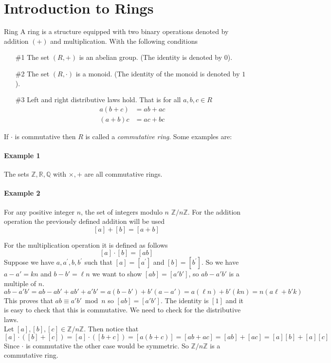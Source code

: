 \documentclass[16pt,a4paper]{article}
\theoremstyle{definition}
\begin{document}
\newpage

\section{Introduction to Rings}

\begin{defn}{Ring}{}
A ring is a structure equipped with two binary operations denoted by addition $(+)$ and multiplication. With the following conditions 
\begin{itemize}
\item[\#1] The set $(R,+)$ is an abelian group. (The identity is denoted by $0$). 


\item[\#2] The set $(R,\cdot)$ is a monoid. (The identity of the monoid is denoted by $1$). 

\item[\#3] Left and right distributive laws hold. That is for all $a,b,c\in R$
\begin{align*}
a(b+c) &= ab+ac\\
(a+b)c &= ac+bc
\end{align*}
\end{itemize}
\end{defn}

If $\cdot$ is commutative then $R$ is called a \emph{commutative ring}. Some examples are:
\paragraph*{Example 1} The sets $\mathbb{Z,R,Q}$ with $\times, +$ are all commutative rings.  

\paragraph*{Example 2} For any positive integer $n$, the set of integers modulo $n$ $\mathbb{Z}/n\mathbb{Z}$. For the addition operation the previously defined addition will be used 
\[[a]+[b]=[a+b]\]
 
For the multiplication operation it is defined as follows 
\[[a]\cdot[b] = [ab]\]
Suppose we have $a,a^\prime, b,b^\prime$ such that $[a]=[a^\prime]$ and $[b]=[b^\prime]$. So we have $a-a' = kn$ and $b-b'=\ell n$ we want to show $[ab]=[a'b']$, so $ab-a'b'$ is a multiple of $n$. 
\[ab-a'b' = ab-ab'+ab'+a'b' = a(b-b')+b'(a-a')=a(\ell n) + b'(kn) = n(a\ell + b'k)\]
This proves that $ab\equiv a'b'\bmod n$ so $[ab]=[a'b']$. The identity is $[1]$ and  it is easy to check that this is commutative. We need to check for the distributive laws. 
\\
Let $[a],[b],[c] \in \mathbb{Z}/n\mathbb{Z}$. Then notice that 
\[[a]\cdot ([b]+[c]) = [a]\cdot ([b+c]) = [a(b+c)] = [ab+ac] = [ab]+[ac] = [a][b]+[a][c]\] 
Since $\cdot$ is commutative the other case would be symmetric. So $\mathbb{Z}/n\mathbb{Z}$ is a commutative ring. 
\end{document}
